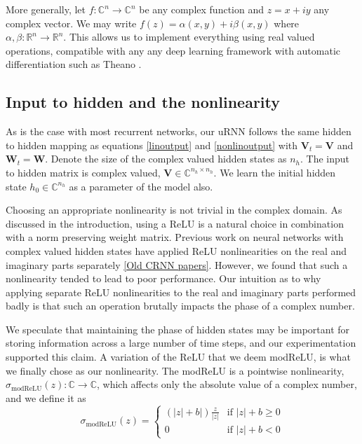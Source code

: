 \documentclass{article} %
\newcommand{\matr}[1]{\mathbf{#1}}
\newcommand\RR{\mathbb{R}}
\newcommand\CC{\mathbb{C}}
\begin{document}
More generally, let $f: \CC^n \rightarrow \CC^n$ be any complex function and $z = x + i y$ 
any complex vector. We may write $ f(z) = \alpha(x, y) + i \beta(x, y) $ where 
$\alpha, \beta : \RR^n \rightarrow \RR^n$. 
This allows us to implement everything using real valued operations, compatible with any
any deep learning framework with automatic differentiation such as Theano \citep{Fred2010}.

\subsection{Input to hidden and the nonlinearity}

As is the case with most recurrent networks, our uRNN follows the same hidden to hidden mapping as 
equations \ref{linoutput} and \ref{nonlinoutput} with $\matr{V}_t = \matr{V}$ and $\matr{W}_t = \matr{W}$. 
Denote the size of the complex valued hidden states as $n_h$.
The input to hidden matrix is complex valued, $\matr{V} \in \CC^{n_h \times n_h}$. 
We learn the initial hidden state $h_0 \in \CC^{n_h}$ as a parameter of the model also.

Choosing an appropriate nonlinearity is not trivial in the complex domain.
As discussed in the introduction, using a ReLU is a natural choice in combination with a norm preserving
weight matrix. {\color{red}Previous work on neural networks with complex valued} hidden states 
have applied ReLU nonlinearities on the real and imaginary parts separately \ref{Old CRNN papers}.
However, we found that such a nonlinearity {\color{red}tended to lead to} poor performance.
Our intuition as to why applying separate ReLU nonlinearities to the real 
and imaginary parts performed badly is that such an operation brutally impacts the 
phase of a complex number.

We speculate that maintaining the phase of hidden states may be important for storing information 
across a large number of time steps, and our experimentation supported this claim.
A variation of the ReLU that we deem modReLU, is what we 
finally chose as our nonlinearity. The modReLU is a pointwise nonlinearity,  
$\sigma_\mathrm{modReLU} (z) : \CC \rightarrow \CC$, which
affects only the absolute value of a complex number, and we define it as 
\begin{equation} \sigma_\mathrm{modReLU} (z) = 
\left\{
  \begin{array}{ll}
    (|z|+b|) \frac{z}{|z|}  & \mbox{if } |z| + b \geq 0 \\
    0 & \mbox{if } |z| + b < 0
  \end{array}
\right.
\end{equation}
\end{document}

